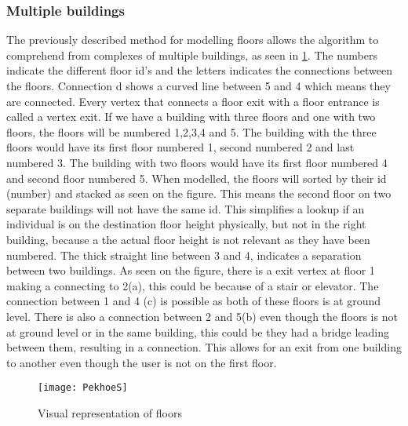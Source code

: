 \subsubsection{Multiple buildings}

The previously described method for modelling floors allows the algorithm to comprehend from complexes of multiple buildings, as seen in \cref{fig:PekhoeS}. The numbers indicate the different floor id's and the letters indicates the connections between the floors. Connection d shows a curved line between 5 and 4 which means they are connected. Every vertex that connects a floor exit with a floor entrance is called a vertex exit\label{e_vertex}. If we have a building with three floors and one with two floors, the floors will be numbered 1,2,3,4 and 5. The building with the three floors would have its first floor numbered 1, second numbered 2 and last numbered 3. The building with two floors would have its first floor numbered 4 and second floor numbered 5. When modelled, the floors will sorted by their id (number) and stacked as seen on the figure. This means the second floor on two separate buildings will not have the same id. This simplifies a lookup if an individual is on the destination floor height physically, but not in the right building, because a the actual floor height is not relevant as they have been numbered. The thick straight line between 3 and 4, indicates a separation between two buildings. As seen on the figure, there is a exit vertex at floor 1 making a connecting to 2(a), this could be because of a stair or elevator. The connection between 1 and 4 (c) is possible as both of these floors is at ground level. There is also a connection between 2 and 5(b) even though the floors is not at ground level or in the same building, this could be they had a bridge leading between them, resulting in a connection. This allows for an exit from one building to another even though the user is not on the first floor. 
\begin{figure}[ht!]
    \centering
    \texttt{[image: PekhoeS]}
    \caption{Visual representation of floors}
    \label{fig:PekhoeS}
  \end{figure}

